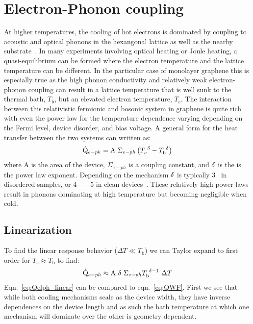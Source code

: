\section{Electron-Phonon coupling}
\label{section:elph}
At higher temperatures, the cooling of hot electrons is dominated by coupling to acoustic and optical phonons in the hexangonal lattice as well as the nearby substrate~\cite{viljas_electron-phonon_2010,bistritzer_electronic_2009}. In many experiments involving optical heating or Joule heating, a quasi-equilibrium can be formed where the electron temperature and the lattice temperature can be different. In the particular case of monolayer graphene this is especially true as the high phonon conductivity and relatively weak electron-phonon coupling can result in a lattice temperature that is well sunk to the thermal bath, $T_\mathrm{b}$, but an elevated electron temperature, $T_e$. The interaction between this relativistic fermionic and bosonic system in graphene is quite rich with even the power law for the temperature dependence varying depending on the Fermi level, device disorder, and bias voltage. A general form for the heat transfer between the two systems can written as:
\begin{equation}\label{eq:Qelph}
\dot{\mathrm{Q}}_{e-ph}=\mathrm{A}~\Sigma_{e-ph}\left( T_e^{~\mathrm{\delta}} - T_\mathrm{b}^{~\mathrm{\delta}} \right)
\end{equation}
where $\mathrm{A}$ is the area of the device, $\Sigma_{e-ph}$ is a coupling constant, and $\mathrm{\delta}$ is the is the power law exponent. Depending on the mechanism $\mathrm{\delta}$ is typically $3$~\cite{song_disorder-assisted_2012, chen_electron-phonon_2012} in disordered samples,  or $4--5$ in clean devices~\cite{viljas_electron-phonon_2010, bistritzer_electronic_2009}. These relatively high power laws result in phonons dominating at high temperature but becoming negligible when cold.
\subsection{Linearization}
To find the linear response behavior ($\Delta T \ll T_\mathrm{b}$) we can Taylor expand to first order for $T_e\approx T_\mathrm{b}$ to find:
\begin{equation}\label{eq:Qelph_linear}
\dot{\mathrm{Q}}_{e-ph} \approx \mathrm{A}~\mathrm{\delta}~\Sigma_{e-ph}T_\mathrm{b}^{~\mathrm{\delta}-1}~\Delta T
\end{equation}
Eqn.~\ref{eq:Qelph_linear} can be compared to eqn.~\ref{eq:QWF}. First we see that while both cooling mechanisms scale as the device width, they have inverse dependences on the device length and as such the bath temperature at which one mechanism will dominate over the other is geometry dependent.

